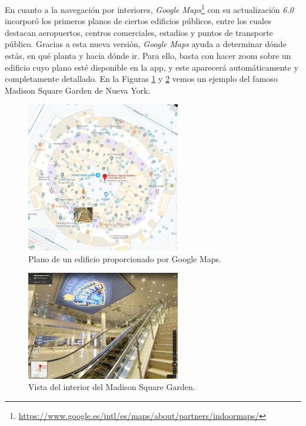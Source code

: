 En cuanto a la navegación por interiores, \textit{Google Maps}\footnote{\url{https://www.google.es/intl/es/maps/about/partners/indoormaps/}} con su actualización \textit{6.0} incorporó los primeros planos de ciertos edificios públicos, entre los cuales destacan aeropuertos, centros comerciales, estadios y puntos de transporte público. Gracias a esta nueva versión, \textit{Google Maps} ayuda a determinar dónde estás, en qué planta y hacia dónde ir. Para ello, basta con hacer zoom sobre un edificio cuyo plano esté disponible en la app, y este aparecerá automáticamente y completamente detallado. En la Figuras \ref{fig:ejemplo} y \ref{fig:ejemplo2} vemos un ejemplo del famoso Madison Square Garden de Nueva York.


 

\begin{figure}[t]
	\centering
	\includegraphics[width=0.6\textwidth]{Imagenes/Estadodelacuestion/MadSq2}
	\caption{Plano de un edificio proporcionado por Google Maps.}
	\label{fig:ejemplo}
\end{figure}

\begin{figure}[t]
	\centering
	\includegraphics[width=0.6\textwidth]{Imagenes/Estadodelacuestion/MadSq3}
	\caption{Vista del interior del Madison Square Garden. }
	\label{fig:ejemplo2}
\end{figure}

